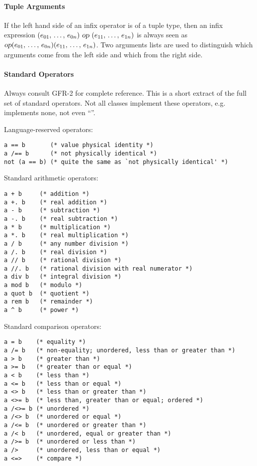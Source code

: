 \paragraph{Tuple Arguments}

If the left hand side of an infix operator is of a tuple type, then an infix expression $(e_{01} ,\, \ldots ,\, e_{0n})\ \mbox{\sl op}\ (e_{11} ,\, \ldots ,\, e_{1n})$ is  always seen as $\mbox{\sl op}(e_{01} ,\, \ldots ,\, e_{0n})(e_{11} ,\, \ldots ,\, e_{1n})$. Two arguments lists are used to distinguish which arguments come from the left side and which from the right side. 





\paragraph{Standard Operators}

Always consult GFR-2 for complete reference. This is a short extract of the full set of standard operators. Not all classes implement these operators, e.g.  implements none, not even ``\code{=}''. 

Language-reserved operators:
\begin{lstlisting}
a == b       (* value physical identity *)
a /== b      (* not physically identical *)
not (a == b) (* quite the same as `not physically identical' *)
\end{lstlisting}

Standard arithmetic operators:
\begin{lstlisting}
a + b     (* addition *)
a +. b    (* real addition *)
a - b     (* subtraction *)
a -. b    (* real subtraction *)
a * b     (* multiplication *)
a *. b    (* real multiplication *)
a / b     (* any number division *)
a /. b    (* real division *)
a // b    (* rational division *)
a //. b   (* rational division with real numerator *)
a div b   (* integral division *)
a mod b   (* modulo *)
a quot b  (* quotient *)
a rem b   (* remainder *)
a ^ b     (* power *)
\end{lstlisting}

Standard comparison operators:
\begin{lstlisting}
a = b    (* equality *)
a /= b   (* non-equality; unordered, less than or greater than *)
a > b    (* greater than *)
a >= b   (* greater than or equal *)
a < b    (* less than *)
a <= b   (* less than or equal *)
a <> b   (* less than or greater than *)
a <>= b  (* less than, greater than or equal; ordered *)
a /<>= b (* unordered *)
a /<> b  (* unordered or equal *)
a /<= b  (* unordered or greater than *)
a /< b   (* unordered, equal or greater than *)
a />= b  (* unordered or less than *)
a />     (* unordered, less than or equal *)
a <=>    (* compare *)
\end{lstlisting}

